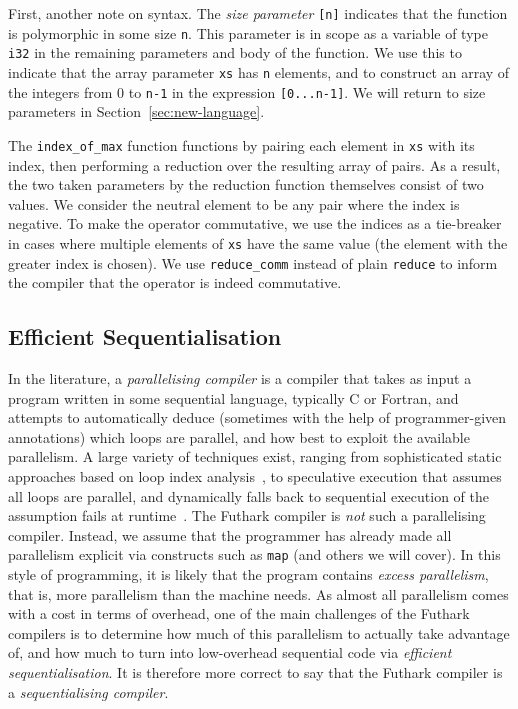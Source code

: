 First, another note on syntax.  The \textit{size parameter}
\lstinline{[n]} indicates that the function is polymorphic in some
size \lstinline{n}.  This parameter is in scope as a variable of type
\lstinline{i32} in the remaining parameters and body of the function.
We use this to indicate that the array parameter \lstinline{xs} has
\lstinline{n} elements, and to construct an array of the integers from
0 to \lstinline{n-1} in the expression \lstinline{[0...n-1]}.  We will
return to size parameters in Section~\ref{sec:new-language}.

The \lstinline{index_of_max} function functions by pairing each
element in \lstinline{xs} with its index, then performing a reduction
over the resulting array of pairs.  As a result, the two taken
parameters by the reduction function themselves consist of two values.
We consider the neutral element to be any pair where the index is
negative.  To make the operator commutative, we use the indices as a
tie-breaker in cases where multiple elements of \lstinline{xs} have
the same value (the element with the greater index is chosen).  We use
\lstinline{reduce_comm} instead of plain \lstinline{reduce} to inform
the compiler that the operator is indeed commutative.

\subsection{Efficient Sequentialisation}
\label{sec:efficient-sequentialisation}

In the literature, a \textit{parallelising compiler} is a compiler
that takes as input a program written in some sequential language,
typically C or Fortran, and attempts to automatically deduce
(sometimes with the help of programmer-given annotations) which loops
are parallel, and how best to exploit the available parallelism.  A
large variety of techniques exist, ranging from sophisticated static
approaches based on loop index analysis~\cite{PolyhedralOpt}, to
speculative execution that assumes all loops are parallel, and
dynamically falls back to sequential execution of the assumption fails
at runtime~\cite{SpLSC}.  The Futhark compiler is \textit{not} such a
parallelising compiler.  Instead, we assume that the programmer has
already made all parallelism explicit via constructs such as
\lstinline{map} (and others we will cover).  In this style of
programming, it is likely that the program contains \textit{excess
  parallelism}, that is, more parallelism than the machine needs.  As
almost all parallelism comes with a cost in terms of overhead, one of
the main challenges of the Futhark compilers is to determine how much of
this parallelism to actually take advantage of, and how much to turn
into low-overhead sequential code via \textit{efficient
  sequentialisation}.  It is therefore more correct to say that the
Futhark compiler is a \textit{sequentialising compiler}.

